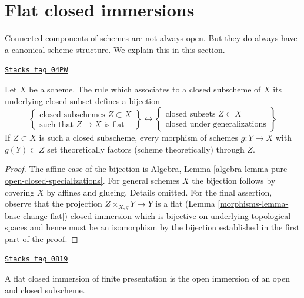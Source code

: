 \section{Flat closed immersions}
\label{morphisms-section-flat-closed-immersions}
Connected components of schemes are not always open. But they do always
have a canonical scheme structure. We explain this in this section.

\begin{lemma}
\label{morphisms-lemma-characterize-flat-closed-immersions}
\href{https://stacks.math.columbia.edu/tag/04PW}{\texttt{Stacks tag 04PW}}

Let $X$ be a scheme. The rule which associates to a closed subscheme
of $X$ its underlying closed subset defines a bijection
$$
\left\{
\begin{matrix}
\text{closed subschemes }Z \subset X \\
\text{such that }Z \to X\text{ is flat}
\end{matrix}
\right\}
\leftrightarrow
\left\{
\begin{matrix}
\text{closed subsets }Z \subset X \\
\text{closed under generalizations}
\end{matrix}
\right\}
$$
If $Z \subset X$ is such a closed subscheme, every morphism of schemes
$g : Y \to X$ with $g(Y) \subset Z$ set theoretically factors (scheme
theoretically) through $Z$.
\end{lemma}

\begin{proof}

The affine case of the bijection is
Algebra, Lemma \ref{algebra-lemma-pure-open-closed-specializations}.
For general schemes $X$ the bijection follows by covering $X$ by affines
and glueing. Details omitted. For the final assertion, observe that the
projection $Z \times_{X, g} Y \to Y$ is a flat
(Lemma \ref{morphisms-lemma-base-change-flat}) closed immersion which
is bijective on underlying topological spaces and hence must be
an isomorphism by the bijection established in the first part of the proof.
\end{proof}

\begin{lemma}
\label{morphisms-lemma-flat-closed-immersions-finite-presentation}
\href{https://stacks.math.columbia.edu/tag/0819}{\texttt{Stacks tag 0819}}

A flat closed immersion of finite presentation
is the open immersion of an open and closed subscheme.
\end{lemma}


